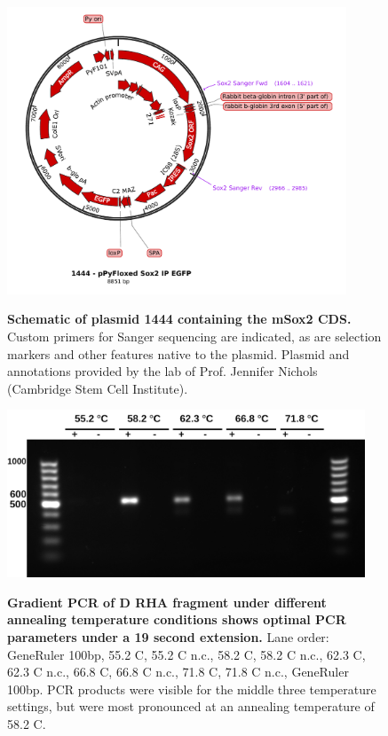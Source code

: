 \documentclass[withindex,glossary]{cam-thesis}
\begin{document}
\begin{figure}[htbp]
\centering
\includegraphics[width=0.9\textwidth]{FigS1_1444 - pPyFloxed Sox2 IP EGFP Map.pdf}
\label{figS1}
\caption{\textbf{Schematic of plasmid 1444 containing the mSox2 CDS.} Custom primers for Sanger sequencing are indicated, as are selection markers and other features native to the plasmid. Plasmid and annotations provided by the lab of Prof. Jennifer Nichols (Cambridge Stem Cell Institute).}
\end{figure}


\begin{figure}[htbp]
\centering
\includegraphics[width=0.95\textwidth]{figs/FigS2_Feb04-D RHA gradient PCR short elongation.png}
\label{figS2}
\caption{\textbf{Gradient PCR of D RHA fragment under different annealing temperature conditions shows optimal PCR parameters under a 19 second extension.} Lane order: GeneRuler 100bp, 55.2 \textdegree{}C, 55.2 \textdegree{}C n.c., 58.2 \textdegree{}C, 58.2 \textdegree{}C n.c., 62.3 \textdegree{}C, 62.3 \textdegree{}C n.c., 66.8 \textdegree{}C, 66.8 \textdegree{}C n.c., 71.8 \textdegree{}C, 71.8 \textdegree{}C n.c., GeneRuler 100bp. PCR products were visible for the middle three temperature settings, but were most pronounced at an annealing temperature of 58.2 \textdegree{}C.}
\end{figure}
\end{document}
